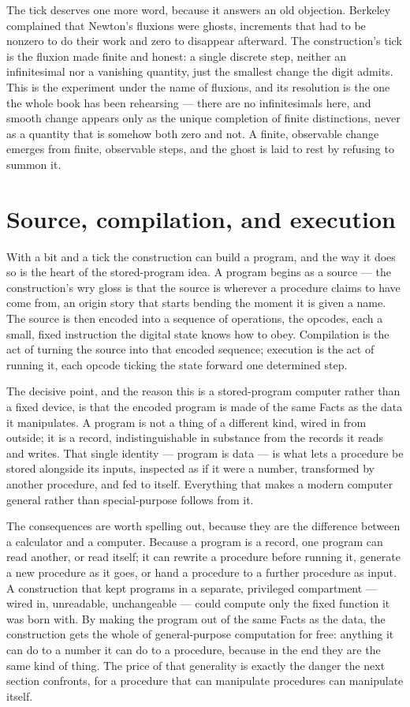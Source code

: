 The tick deserves one more word, because it answers an old objection. Berkeley complained that
Newton's fluxions were ghosts, increments that had to be nonzero to do their work and zero to
disappear afterward. The construction's tick is the fluxion made finite and honest: a single discrete
step, neither an infinitesimal nor a vanishing quantity, just the smallest change the digit admits.
This is the experiment under the name of fluxions, and its resolution is the one the whole book has
been rehearsing --- there are no infinitesimals here, and smooth change appears only as the unique
completion of finite distinctions, never as a quantity that is somehow both zero and not. A finite,
observable change emerges from finite, observable steps, and the ghost is laid to rest by refusing to
summon it.

\section{Source, compilation, and execution}
\label{se:source-compilation-and-execution}

With a bit and a tick the construction can build a program, and the way it does so is the heart of the
stored-program idea. A program begins as a source --- the construction's wry gloss is that the source
is wherever a procedure claims to have come from, an origin story that starts bending the moment it is
given a name. The source is then encoded into a sequence of operations, the opcodes, each a small,
fixed instruction the digital state knows how to obey. Compilation is the act of turning the source
into that encoded sequence; execution is the act of running it, each opcode ticking the state forward
one determined step.

The decisive point, and the reason this is a stored-program computer rather than a fixed device, is
that the encoded program is made of the same Facts as the data it manipulates. A program is not a
thing of a different kind, wired in from outside; it is a record, indistinguishable in substance from
the records it reads and writes. That single identity --- program is data --- is what lets a procedure
be stored alongside its inputs, inspected as if it were a number, transformed by another procedure, and
fed to itself. Everything that makes a modern computer general rather than special-purpose follows from
it.

The consequences are worth spelling out, because they are the difference between a calculator and a
computer. Because a program is a record, one program can read another, or read itself; it can rewrite a
procedure before running it, generate a new procedure as it goes, or hand a procedure to a further
procedure as input. A construction that kept programs in a separate, privileged compartment --- wired
in, unreadable, unchangeable --- could compute only the fixed function it was born with. By making the
program out of the same Facts as the data, the construction gets the whole of general-purpose
computation for free: anything it can do to a number it can do to a procedure, because in the end they
are the same kind of thing. The price of that generality is exactly the danger the next section
confronts, for a procedure that can manipulate procedures can manipulate itself.


